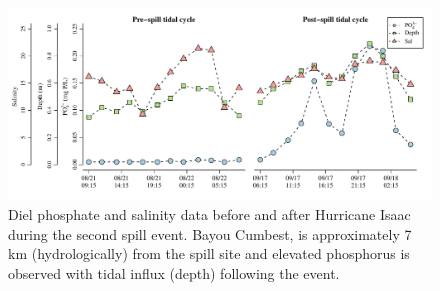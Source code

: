 \documentclass[letterpaper,12pt]{article}\usepackage[]{graphicx}\usepackage[]{color}
\makeatletter
\def\maxwidth{ %
  \ifdim\Gin@nat@width>\linewidth
    \linewidth
  \else
    \Gin@nat@width
  \fi
}
\makeatother
\begin{document}
\begin{figure}[!ht]

{\centering \includegraphics[width=\maxwidth]{figs/Fig5} 

}

\caption[Diel phosphate and salinity data before and after Hurricane Isaac during the second spill event]{Diel phosphate and salinity data before and after Hurricane Isaac during the second spill event. Bayou Cumbest, is approximately 7 km (hydrologically) from the spill site and elevated phosphorus is observed with tidal influx (depth) following the event.}\label{fig:Fig5}
\end{figure}
\end{document}
